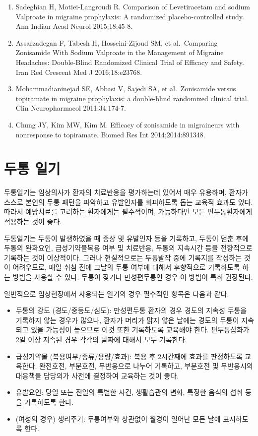 \documentclass[]{book}
\begin{document}
\begin{enumerate}
\item
  Sadeghian H, Motiei-Langroudi R. Comparison of Levetiracetam and sodium Valproate in migraine prophylaxis: A randomized placebo-controlled study. Ann Indian Acad Neurol 2015;18:45-8.
\item
  Assarzadegan F, Tabesh H, Hosseini-Zijoud SM, et al.~Comparing Zonisamide With Sodium Valproate in the Management of Migraine Headaches: Double-Blind Randomized Clinical Trial of Efficacy and Safety. Iran Red Crescent Med J 2016;18:e23768.
\item
  Mohammadianinejad SE, Abbasi V, Sajedi SA, et al.~Zonisamide versus topiramate in migraine prophylaxis: a double-blind randomized clinical trial. Clin Neuropharmacol 2011;34:174-7.
\item
  Chung JY, Kim MW, Kim M. Efficacy of zonisamide in migraineurs with nonresponse to topiramate. Biomed Res Int 2014;2014:891348.
\end{enumerate}

\cleardoublepage

\hypertarget{appendix-appendix}{%
\appendix}


\hypertarget{section-20}{%
\chapter{두통 일기}\label{section-20}}

두통일기는 임상의사가 환자의 치료반응을 평가하는데 있어서 매우 유용하며, 환자가 스스로 본인의 두통 패턴을 파악하고 유발인자를 회피하도록 돕는 교육적 효과도 있다. 따라서 예방치료를 고려하는 환자에게는 필수적이며, 가능하다면 모든 편두통환자에게 적용하는 것이 좋다.

두통일기는 두통이 발생하였을 때 증상 및 유발인자 등을 기록하고, 두통이 멈춘 후에 두통의 완화요인, 급성기약물복용 여부 및 치료반응, 두통의 지속시간 등을 전향적으로 기록하는 것이 이상적이다. 그러나 현실적으로는 두통발작 중에 기록지를 작성하는 것이 어려우므로, 매일 취침 전에 그날의 두통 여부에 대해서 후향적으로 기록하도록 하는 방법을 사용할 수 있다. 두통이 잦거나 만성편두통인 경우 이 방법이 특히 권장된다.

일반적으로 임상현장에서 사용되는 일기의 경우 필수적인 항목은 다음과 같다.

\begin{itemize}
\item
  두통의 강도 (경도/중등도/심도): 만성편두통 환자의 경우 경도의 지속성 두통을 기록하지 않는 경우가 많으나, 환자가 머리가 맑지 않은 날에는 경도의 두통이 지속되고 있을 가능성이 높으므로 이것 또한 기록하도록 교육해야 한다. 편두통삽화가 2일 이상 지속된 경우 각각의 날짜에 대해서 모두 기록한다.
\item
  급성기약물 (복용여부/종류/용량/효과): 복용 후 2시간째에 효과를 판정하도록 교육한다. 완전호전, 부분호전, 무반응으로 나누어 기록하고, 부분호전 및 무반응시의 대응책을 담당의가 사전에 결정하여 교육하는 것이 좋다.
\item
  유발요인: 당일 또는 전일의 특별한 사건, 생활습관의 변화, 특정한 음식의 섭취 등을 기록하도록 한다.
\item
  (여성의 경우) 생리주기: 두통여부와 상관없이 월경이 일어난 모든 날에 표시하도록 한다.
\end{itemize}
\end{document}
